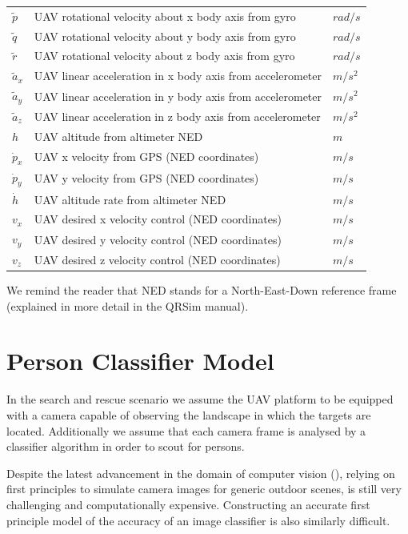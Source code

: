 \documentclass[a4paper,11pt]{report}
\newcommand{\sname}{QRSim\xspace}
\begin{document}
\begin{table}[ht]
\begin{tabular}{l l l}
     $\tilde{p}$  & UAV rotational velocity about x body axis from gyro                 & $rad/s$\\ 
     $\tilde{q}$  & UAV rotational velocity about y body axis from gyro                 & $rad/s$\\ 
     $\tilde{r}$  & UAV rotational velocity about z body axis from gyro                & $rad/s$\\
     $\tilde{a}_x$ & UAV linear acceleration in x body axis from accelerometer            & $m/s^2$\\
     $\tilde{a}_y$ & UAV linear acceleration in y body axis from accelerometer             & $m/s^2$\\
     $\tilde{a}_z$ & UAV linear acceleration in z body axis from accelerometer             & $m/s^2$\\
     $h$& UAV altitude from altimeter NED & $m$\\
     $\dot{p}_x$ & UAV x velocity from GPS (NED coordinates)            & $m/s$\\
     $\dot{p}_y$ & UAV y velocity from GPS (NED coordinates)            & $m/s$\\
     $\dot{h}$    & UAV altitude rate from altimeter NED                   & $m/s$\\
     $v_x$ & UAV desired x velocity control (NED coordinates)            & $m/s$\\ 
     $v_y$ & UAV desired y velocity control (NED coordinates)            & $m/s$\\ 
     $v_z$ & UAV desired z velocity control (NED coordinates)            & $m/s$\\
\end{tabular}
\end{table}

We remind the reader that NED stands for a North-East-Down reference frame (explained in more detail in the \sname manual).

\section{Person Classifier Model} \label{personclassifier}

In the search and rescue scenario we assume the UAV platform to be equipped with a camera capable of observing the landscape in which the targets are located. Additionally we assume that each camera frame is analysed by a classifier algorithm in order to scout for persons. 

Despite the latest advancement in the domain of computer vision (\cite{handa2012}), relying on first principles to simulate camera images for generic outdoor scenes, is still very challenging and computationally expensive. Constructing an accurate first principle model of the accuracy of an image classifier is also similarly difficult.
\end{document}
